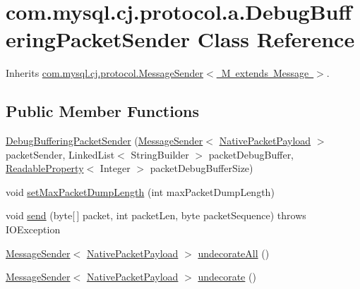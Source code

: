 \hypertarget{classcom_1_1mysql_1_1cj_1_1protocol_1_1a_1_1_debug_buffering_packet_sender}{}\section{com.\+mysql.\+cj.\+protocol.\+a.\+Debug\+Buffering\+Packet\+Sender Class Reference}
\label{classcom_1_1mysql_1_1cj_1_1protocol_1_1a_1_1_debug_buffering_packet_sender}


Inherits \mbox{\hyperlink{interfacecom_1_1mysql_1_1cj_1_1protocol_1_1_message_sender}{com.\+mysql.\+cj.\+protocol.\+Message\+Sender$<$ M extends Message $>$}}.

\subsection*{Public Member Functions}
\begin{DoxyCompactItemize}
\item 
\mbox{\hyperlink{classcom_1_1mysql_1_1cj_1_1protocol_1_1a_1_1_debug_buffering_packet_sender_a38f99efbc9f851281f90960cd17905f7}{Debug\+Buffering\+Packet\+Sender}} (\mbox{\hyperlink{interfacecom_1_1mysql_1_1cj_1_1protocol_1_1_message_sender}{Message\+Sender}}$<$ \mbox{\hyperlink{classcom_1_1mysql_1_1cj_1_1protocol_1_1a_1_1_native_packet_payload}{Native\+Packet\+Payload}} $>$ packet\+Sender, Linked\+List$<$ String\+Builder $>$ packet\+Debug\+Buffer, \mbox{\hyperlink{interfacecom_1_1mysql_1_1cj_1_1conf_1_1_readable_property}{Readable\+Property}}$<$ Integer $>$ packet\+Debug\+Buffer\+Size)
\item 
void \mbox{\hyperlink{classcom_1_1mysql_1_1cj_1_1protocol_1_1a_1_1_debug_buffering_packet_sender_a0cf9cc48937a3ae8101dbe8bb3ce103e}{set\+Max\+Packet\+Dump\+Length}} (int max\+Packet\+Dump\+Length)
\item 
void \mbox{\hyperlink{classcom_1_1mysql_1_1cj_1_1protocol_1_1a_1_1_debug_buffering_packet_sender_ace4962a5811f350ebad23d8c985be11f}{send}} (byte\mbox{[}$\,$\mbox{]} packet, int packet\+Len, byte packet\+Sequence)  throws I\+O\+Exception 
\item 
\mbox{\hyperlink{interfacecom_1_1mysql_1_1cj_1_1protocol_1_1_message_sender}{Message\+Sender}}$<$ \mbox{\hyperlink{classcom_1_1mysql_1_1cj_1_1protocol_1_1a_1_1_native_packet_payload}{Native\+Packet\+Payload}} $>$ \mbox{\hyperlink{classcom_1_1mysql_1_1cj_1_1protocol_1_1a_1_1_debug_buffering_packet_sender_a00c2c86d5ab855c81addbc039560b66b}{undecorate\+All}} ()
\item 
\mbox{\hyperlink{interfacecom_1_1mysql_1_1cj_1_1protocol_1_1_message_sender}{Message\+Sender}}$<$ \mbox{\hyperlink{classcom_1_1mysql_1_1cj_1_1protocol_1_1a_1_1_native_packet_payload}{Native\+Packet\+Payload}} $>$ \mbox{\hyperlink{classcom_1_1mysql_1_1cj_1_1protocol_1_1a_1_1_debug_buffering_packet_sender_a64d9081f4ce1701a67747cbb9462d4f3}{undecorate}} ()
\end{DoxyCompactItemize}


